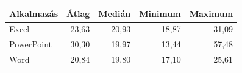 \begin{tabular}{@{}lrrrr@{}}
\toprule
Alkalmazás & Átlag & Medián & Minimum & Maximum \\
\midrule
Excel & 23,63 & 20,93 & 18,87 & 31,09 \\
PowerPoint & 30,30 & 19,97 & 13,44 & 57,48 \\
Word & 20,84 & 19,80 & 17,10 & 25,61 \\
\bottomrule
\end{tabular}
